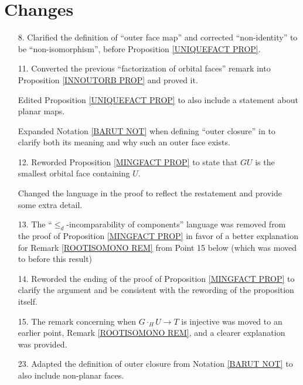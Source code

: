 \documentclass{article}
\begin{document}
\section{Changes}

\begin{itemize}

      \subsubsection*{Orbital faces and outer closures}
\item[8.] Clarified the definition of ``outer face map'' and corrected ``non-identity'' to be ``non-isomorphism'', before Proposition \ref{UNIQUEFACT PROP}.%
      
\item[11.] Converted the previous ``factorization of orbital faces'' remark into Proposition \ref{INNOUTORB PROP} and proved it.
      
Edited Proposition \ref{UNIQUEFACT PROP} to also include a statement about planar maps.

Expanded Notation \ref{BARUT NOT} when defining ``outer closure'' in to clarify both its meaning and why such an outer face exists. %

\item[12.] Reworded Proposition \ref{MINGFACT PROP} to state that $GU$ is the smallest orbital face containing $U$.
      
      Changed the language in the proof to reflect the restatement and provide some extra detail. %
      
\item[13.] The ``$\leq_d$-incomparability of components'' language was removed from the proof of Proposition \ref{MINGFACT PROP} in favor of a better explanation for Remark \ref{ROOTISOMONO REM} from Point 15 below (which was moved to before this result) %
      
\item[14.] Reworded the ending of the proof of Proposition \ref{MINGFACT PROP} to clarify the argument and be consistent with the rewording of the proposition itself. %
      
\item[15.] The remark concerning when $G\cdot_H U \to T$ is injective was moved to an earlier point, Remark \ref{ROOTISOMONO REM}, and a clearer explanation was provided. %

\item[23.] Adapted the definition of outer closure from Notation \ref{BARUT NOT} to also include non-planar faces.
      

\end{itemize}
\end{document}
